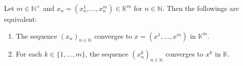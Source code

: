 \begin{proposition}
    Let \(m \in \mathbb{N}^\times\) and \(x_n = \left(x^1_n, \ldots, x^m_n\right) \in \mathbb{K}^m\)
    for \(n \in \mathbb{N}\). Then the followings are equivalent:
    \begin{enumerate}
        \item The sequence \(\left(x_n\right)_{n\in \mathbb{N}}\) converges to 
        \(x = \left(x^1, \ldots, x^m\right)\) in \(\mathbb{K}^m\). 
        \item For each \(k \in \{1, \ldots, m\}\), the sequence \(\left(x^k_n\right)_{n\in\mathbb{N}}\)
        converges to \(x^k\) in \(\mathbb{K}\). 
    \end{enumerate}
\end{proposition}

